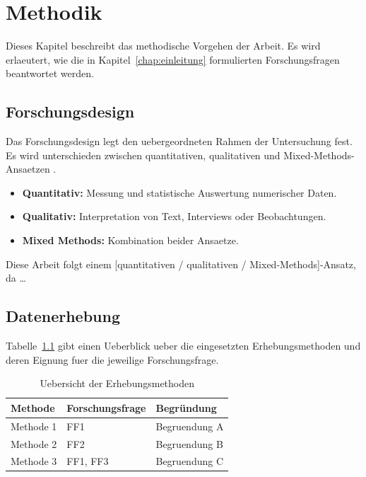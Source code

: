 
\chapter{Methodik}
\label{chap:methodik}

Dieses Kapitel beschreibt das methodische Vorgehen der Arbeit. Es wird
erlaeutert, wie die in Kapitel~\ref{chap:einleitung} formulierten
Forschungsfragen beantwortet werden.

\section{Forschungsdesign}
\label{sec:forschungsdesign}

Das Forschungsdesign legt den uebergeordneten Rahmen der Untersuchung fest.
Es wird unterschieden zwischen quantitativen, qualitativen und
Mixed-Methods-Ansaetzen \autocite{beispiel_buch_2020}.

\begin{itemize}
  \item \textbf{Quantitativ:} Messung und statistische Auswertung numerischer Daten.
  \item \textbf{Qualitativ:} Interpretation von Text, Interviews oder Beobachtungen.
  \item \textbf{Mixed Methods:} Kombination beider Ansaetze.
\end{itemize}

Diese Arbeit folgt einem [quantitativen / qualitativen / Mixed-Methods]-Ansatz,
da \ldots

\section{Datenerhebung}
\label{sec:datenerhebung}

Tabelle~\ref{tab:methoden} gibt einen Ueberblick ueber die eingesetzten
Erhebungsmethoden und deren Eignung fuer die jeweilige Forschungsfrage.

\begin{table}[h]
\centering
\caption{Uebersicht der Erhebungsmethoden}
\label{tab:methoden}
\begin{tabular}{lll}
\toprule
\textbf{Methode}    & \textbf{Forschungsfrage} & \textbf{Begründung} \\
\midrule
Methode 1           & FF1                      & Begruendung A       \\
Methode 2           & FF2                      & Begruendung B       \\
Methode 3           & FF1, FF3                 & Begruendung C       \\
\bottomrule
\end{tabular}
\end{table}


